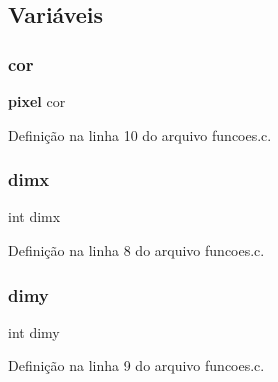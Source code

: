 \subsection{Variáveis}
\mbox{\label{funcoes_8c_a42c49567964d207baf63bbc1a955e15e}} 
\subsubsection{cor}
{\footnotesize\ttfamily \textbf{ pixel} cor}



Definição na linha 10 do arquivo funcoes.\+c.

\mbox{\label{funcoes_8c_a8b0f6ae031a507c3ffb7bf0eec290d46}} 
\subsubsection{dimx}
{\footnotesize\ttfamily int dimx}



Definição na linha 8 do arquivo funcoes.\+c.

\mbox{\label{funcoes_8c_a3a072d6ef9c51d085b44eac70f2edff6}} 
\subsubsection{dimy}
{\footnotesize\ttfamily int dimy}



Definição na linha 9 do arquivo funcoes.\+c.

